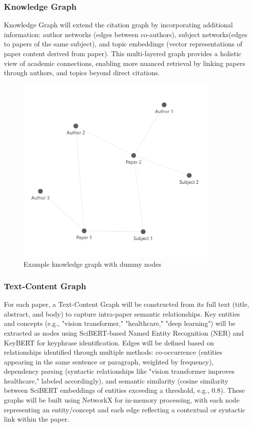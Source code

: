 \documentclass[a4paper,12pt]{article}
\begin{document}
\subsubsection{Knowledge Graph}
Knowledge Graph will extend the citation graph by incorporating additional
information: author networks (edges between co-authors), subject networks(edges
to papers of the same subject), and topic embeddings (vector representations of
paper content derived from paper). This multi-layered graph provides a holistic
view of academic connections, enabling more nuanced retrieval by linking papers
through authors, and topics beyond direct citations.
\begin{figure}[H]
    \centering
    \includegraphics[width=10cm]{knowledgegraph.png}
    \caption{Example knowledge graph with dummy nodes}
\end{figure}

\subsubsection{Text-Content Graph}
For each paper, a Text-Content Graph will be constructed from its full text
(title, abstract, and body) to capture intra-paper semantic relationships. Key
entities and concepts (e.g., "vision transformer," "healthcare," "deep learning")
will be extracted as nodes using SciBERT-based Named Entity Recognition (NER) and
KeyBERT for keyphrase identification. Edges will be defined based on relationships
identified through multiple methods: co-occurrence (entities appearing in the same
sentence or paragraph, weighted by frequency), dependency parsing (syntactic
relationships like "vision transformer improves healthcare," labeled accordingly),
and semantic similarity (cosine similarity between SciBERT embeddings of entities
exceeding a threshold, e.g., 0.8). These graphs will be built using NetworkX for
in-memory processing, with each node representing an entity/concept and each edge
reflecting a contextual or syntactic link within the paper.
\end{document}
